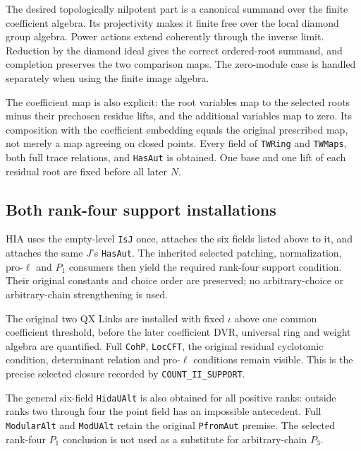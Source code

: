 \documentclass[11pt,a4paper]{article}
\numberwithin{equation}{section}
\theoremstyle{remark}\newtheorem{remark}[theorem]{Remark}
\begin{document}
The desired topologically nilpotent part is a canonical summand
over the finite coefficient algebra.  Its projectivity makes it
finite free over the local diamond group algebra.  Power actions
extend coherently through the inverse limit.  Reduction by the
diamond ideal gives the correct ordered-root summand, and
completion preserves the two comparison maps.  The zero-module
case is handled separately when using the finite image algebra.

The coefficient map is also explicit: the root variables map
to the selected roots minus their prechosen residue lifts, and
the additional variables map to zero.  Its composition with the
coefficient embedding equals the original prescribed map, not
merely a map agreeing on closed points.  Every field of
\texttt{TWRing} and \texttt{TWMaps}, both full trace relations,
and \texttt{Has\allowbreak Aut} is obtained.  One base and one lift of each
residual root are fixed before all later $N$.

\subsection{Both rank-four support installations}

HIA uses the empty-level \texttt{Is\allowbreak J} once, attaches the six
fields listed above to it, and attaches the same $J$'s
\texttt{Has\allowbreak Aut}.  The inherited selected patching, normalization,
pro-$\ell$ and $P_1$ consumers then yield the required rank-four
support condition.  Their original constants and choice order
are preserved; no arbitrary-choice or arbitrary-chain
strengthening is used.

The original two QX Links are installed with fixed $\iota$ above
one common coefficient threshold, before the later coefficient
DVR, universal ring and weight algebra are quantified.  Full
\texttt{Coh\allowbreak P}, \texttt{Loc\allowbreak CFT}, the original residual
cyclotomic condition, determinant relation and pro-$\ell$
conditions remain visible.  This is the precise selected closure
recorded by \texttt{COUNT\_\allowbreak II\_\allowbreak SUPPORT}.

The general six-field \texttt{Hida\allowbreak UAlt} is also obtained for
all positive ranks: outside ranks two through four the point
field has an impossible antecedent.  Full \texttt{Modular\allowbreak Alt}
and \texttt{Mod\allowbreak UAlt} retain the original \texttt{Pfrom\allowbreak Aut}
premise.  The selected rank-four $P_1$ conclusion is not used
as a substitute for arbitrary-chain $P_3$.
\end{document}
